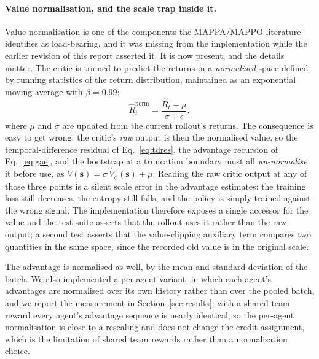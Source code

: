 \documentclass[conference]{IEEEtran}
\begin{document}
\paragraph{Value normalisation, and the scale trap inside it.}
Value normalisation is one of the components the MAPPA/MAPPO literature identifies as load-bearing, and it was missing from the implementation while the earlier revision of this report asserted it. It is now present, and the details matter. The critic is trained to predict the returns in a \emph{normalised} space defined by running statistics of the return distribution, maintained as an exponential moving average with $\beta=0.99$:
\begin{equation}
\widehat R_t^{\mathrm{norm}}=\frac{\widehat R_t-\mu}{\sigma+\epsilon},
\label{eq:valuenorm}
\end{equation}
where $\mu$ and $\sigma$ are updated from the current rollout's returns. The consequence is easy to get wrong: the critic's \emph{raw} output is then the normalised value, so the temporal-difference residual of Eq.~\eqref{eq:tdres}, the advantage recursion of Eq.~\eqref{eq:gae}, and the bootstrap at a truncation boundary must all \emph{un-normalise} it before use, as $V(\mathbf s)=\sigma\,\hat V_\phi(\mathbf s)+\mu$. Reading the raw critic output at any of those three points is a silent scale error in the advantage estimates: the training loss still decreases, the entropy still falls, and the policy is simply trained against the wrong signal. The implementation therefore exposes a single accessor for the value and the test suite asserts that the rollout uses it rather than the raw output; a second test asserts that the value-clipping auxiliary term compares two quantities in the same space, since the recorded old value is in the original scale.

The advantage is normalised as well, by the mean and standard deviation of the batch. We also implemented a per-agent variant, in which each agent's advantages are normalised over its own history rather than over the pooled batch, and we report the measurement in Section~\ref{sec:results}: with a shared team reward every agent's advantage sequence is nearly identical, so the per-agent normalisation is close to a rescaling and does not change the credit assignment, which is the limitation of shared team rewards rather than a normalisation choice.
\end{document}
